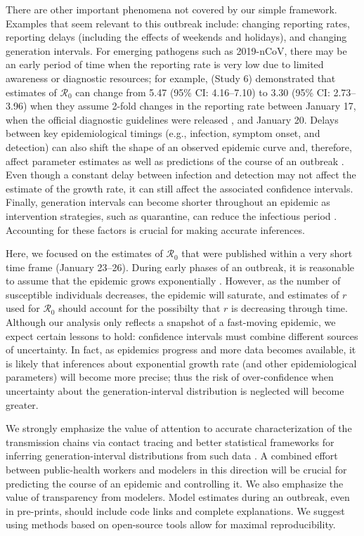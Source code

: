\documentclass[12pt]{article}
\newcommand{\Ro}{\ensuremath{{\mathcal R}_{0}}\xspace}
\begin{document}
There are other important phenomena not covered by our simple framework. 
Examples that seem relevant to this outbreak include: changing reporting rates, reporting delays (including the effects of weekends and holidays), and changing generation intervals.
For emerging pathogens such as 2019-nCoV, there may be an early period of time when the reporting rate is very low due to limited awareness or diagnostic resources;
for example, \cite{zhaoncov} (Study 6) demonstrated that estimates of \Ro can change from 5.47 (95\% CI: 4.16--7.10) to 3.30 (95\% CI: 2.73--3.96) when they assume 2-fold changes in the reporting rate between January 17, when the official diagnostic guidelines were released \citep{who17protocol}, and January 20.
Delays between key epidemiological timings (e.g., infection, symptom onset, and detection) can also shift the shape of an observed epidemic curve and, therefore, affect parameter estimates as well as predictions of the course of an outbreak \citep{harris1990reporting, tsuzuki2017dynamics, tariq2019assessing}.
Even though a constant delay between infection and detection may not affect the estimate of the growth rate, it can still affect the associated confidence intervals.
Finally, generation intervals can become shorter throughout an epidemic as intervention strategies, such as quarantine, can reduce the infectious period \citep{hethcote2002effects}.
Accounting for these factors is crucial for making accurate inferences.

Here, we focused on the estimates of \Ro that were published within a very short time frame (January 23--26).
During early phases of an outbreak, it is reasonable to assume that the epidemic grows exponentially \citep{anderson1991infectious}. However, as the number of susceptible individuals decreases, the epidemic will saturate, and estimates of $r$ used for \Ro should account for the possibilty that $r$ is decreasing through time.
Although our analysis only reflects a snapshot of a fast-moving epidemic, we expect certain lessons to hold: confidence intervals must combine different sources of uncertainty. 
In fact, as epidemics progress and more data becomes available, it is likely that inferences about exponential growth rate (and other epidemiological parameters) will become more precise; thus the risk of over-confidence when uncertainty about the generation-interval distribution is neglected will become greater.

We strongly emphasize the value of attention to accurate characterization of the transmission chains via contact tracing and better statistical frameworks for inferring generation-interval distributions from such data \citep{britton2019estimation}.
A combined effort between public-health workers and modelers in this direction will be crucial for predicting the course of an epidemic and controlling it.
We also emphasize the value of transparency from modelers.
Model estimates during an outbreak, even in pre-prints, should include code links and complete explanations.
We suggest using methods based on open-source tools allow for maximal reproducibility.
\end{document}
